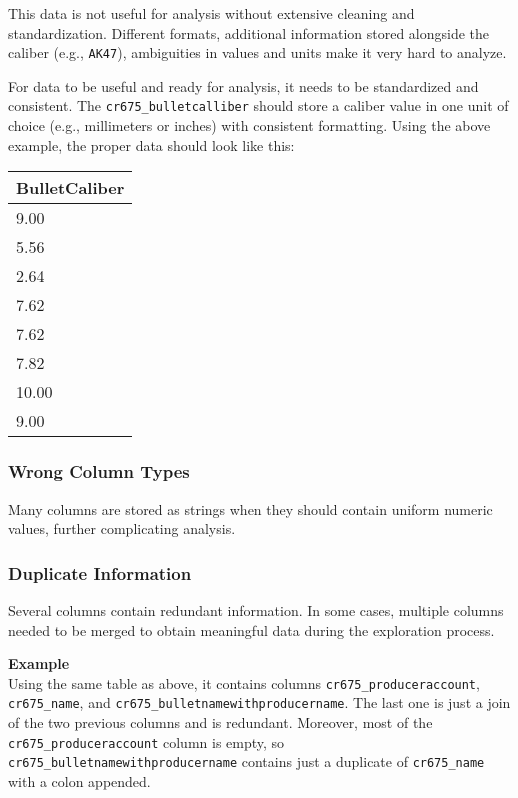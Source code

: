 This data is not useful for analysis without extensive cleaning and standardization. Different formats, additional information stored alongside the caliber (e.g., \texttt{AK47}), ambiguities in values and units make it very hard to analyze.

For data to be useful and ready for analysis, it needs to be standardized and consistent. The \texttt{cr675\_bulletcalliber} should store a caliber value in one unit of choice (e.g., millimeters or inches) with consistent formatting. Using the above example, the proper data should look like this:

\begin{table}[h!]
	\centering
	\begin{tabular}{|l|}
	\hline
	\textbf{BulletCaliber} \\
	\hline
	9.00 \\
	5.56 \\
	2.64 \\
	7.62 \\
	7.62 \\
	7.82 \\
	10.00 \\
	9.00 \\
	\hline
	\end{tabular}
\end{table}

\subsubsection{Wrong Column Types}
Many columns are stored as strings when they should contain uniform numeric values, further complicating analysis.

\newpage

\subsubsection{Duplicate Information}
Several columns contain redundant information. In some cases, multiple columns needed to be merged to obtain meaningful data during the exploration process.

\textbf{Example}\\
Using the same table as above, it contains columns \texttt{cr675\_produceraccount}, \texttt{cr675\_name}, and \texttt{cr675\_bulletnamewithproducername}. The last one is just a join of the two previous columns and is redundant. Moreover, most of the \texttt{cr675\_produceraccount} column is empty, so \texttt{cr675\_bulletnamewithproducername} contains just a duplicate of \texttt{cr675\_name} with a colon appended.

